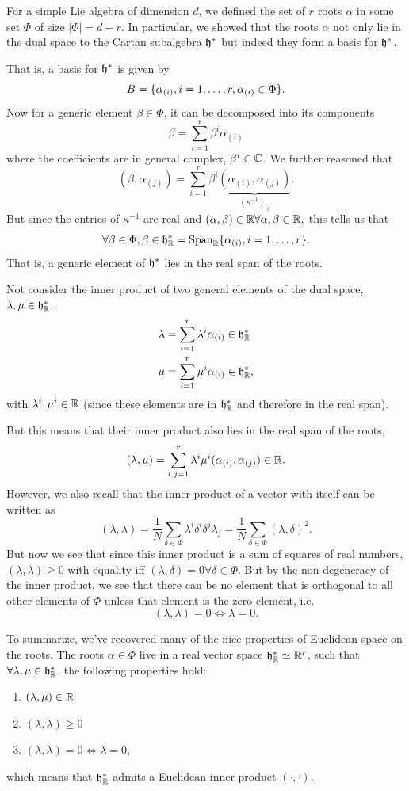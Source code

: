 For a simple Lie algebra of dimension $d$, we defined the set of $r$ roots $\alpha$ in some set $\Phi$ of size $|\Phi|=d-r$. In particular, we showed that the roots $\alpha$ not only lie in the dual space to the Cartan subalgebra $\mathfrak{h}^*$ but indeed they form a basis for $\mathfrak{h}^*$.

That is, a basis for $\mathfrak{h}^*$ is given by
$$B=\{\alpha_{(i)},i=1,\ldots,r,\alpha_{(i)}\in \Phi\}.$$
Now for a generic element $\beta \in \Phi$, it can be decomposed into its components
$$\beta=\sum_{i=1}^r \beta^i \alpha_{(i)}$$ where the coefficients are in general complex, $\beta^i\in \mathbb{C}$. We further reasoned that
$$(\beta,\alpha_{(j)})=\sum_{i=1}^r \beta^i \underbrace{(\alpha_{(i)},\alpha_{(j)})}_{(\kappa^{-1})_{ij}}.$$
But since the entries of $\kappa^{-1}$ are real and $(\alpha,\beta)\in \mathbb{R} \forall \alpha,\beta \in \mathbb{R},$ this tells us that
$$\forall \beta \in \Phi, \beta \in \mathfrak{h}^*_{\mathbb{R}} =\text{Span}_{\mathbb{R}} \{\alpha_{(i)},i=1,\ldots,r\}.$$
That is, a generic element of $\mathfrak{h}^*$ lies in the real span of the roots.

Not consider the inner product of two general elements of the dual space, $\lambda,\mu \in \mathfrak{h}^*_{\mathbb{R}}.$
\begin{align*}
    \lambda&= \sum_{i=1}^r \lambda^i \alpha_{(i)} \in \mathfrak{h}^*_{\mathbb{R}}\\
    \mu&= \sum_{i=1}^r \mu^i \alpha_{(i)} \in \mathfrak{h}^*_{\mathbb{R}},
\end{align*}
with $\lambda^i,\mu^i \in \mathbb{R}$ (since these elements are in $\mathfrak{h}^*_{\mathbb{R}}$ and therefore in the real span).

But this means that their inner product also lies in the real span of the roots,
$$(\lambda,\mu)=\sum_{i,j=1}^r \lambda^i \mu^i (\alpha_{(i)}, \alpha_{(j)})\in \mathbb{R}.$$
However, we also recall that the inner product of a vector with itself can be written as
$$(\lambda,\lambda)=\frac{1}{N}\sum_{\delta\in \Phi}\lambda^i \delta^i \delta^j \lambda_j =\frac{1}{N}\sum_{\delta \in \Phi}(\lambda,\delta)^2.$$
But now we see that since this inner product is a sum of squares of real numbers, $(\lambda,\lambda)\geq 0$ with equality iff $(\lambda,\delta)=0\forall \delta \in \Phi$. But by the non-degeneracy of the inner product, we see that there can be no element that is orthogonal to all other elements of $\Phi$ unless that element is the zero element, i.e.
$$(\lambda,\lambda)=0\iff \lambda=0.$$

To summarize, we've recovered many of the nice properties of Euclidean space on the roots. The roots $\alpha\in \Phi$ live in a real vector space $\mathfrak{h}^*_{\mathbb{R}} \simeq \mathbb{R}^r$, such that $\forall \lambda,\mu\in \mathfrak{h}^*_{\mathbb{R}}$, the following properties hold:
\begin{enumerate}
    \item $(\lambda,\mu)\in \mathbb{R}$
    \item $(\lambda,\lambda)\geq 0$
    \item $(\lambda,\lambda)=0\iff \lambda=0$,
\end{enumerate}
which means that $\mathfrak{h}^*_{\mathbb{R}}$ admits a Euclidean inner product $(\cdot,\cdot)$.

